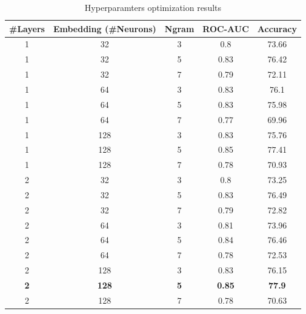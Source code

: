 \documentclass[conference]{IEEEtran}
\begin{document}
\begin{table}[h!]
	\centering
	\begin{tabular}{||c c c c c||} 
		\#Layers & Embedding (\#Neurons) & Ngram & ROC-AUC & Accuracy \\ [0.5ex] 
		\hline\hline
		1      & 32                      & 3     & 0.8     & 73.66    \\
		1      & 32                      & 5     & 0.83    & 76.42    \\
		1      & 32                      & 7     & 0.79    & 72.11    \\
		1      & 64                      & 3     & 0.83    & 76.1     \\
		1      & 64                      & 5     & 0.83    & 75.98    \\
		1      & 64                      & 7     & 0.77    & 69.96    \\
		1      & 128                     & 3     & 0.83    & 75.76    \\
		1      & 128                     & 5     & 0.85    & 77.41    \\
		1      & 128                     & 7     & 0.78    & 70.93    \\
		2      & 32                      & 3     & 0.8     & 73.25    \\
		2      & 32                      & 5     & 0.83    & 76.49    \\
		2      & 32                      & 7     & 0.79    & 72.82    \\
		2      & 64                      & 3     & 0.81    & 73.96    \\
		2      & 64                      & 5     & 0.84    & 76.46    \\
		2      & 64                      & 7     & 0.78    & 72.53    \\
		2      & 128                     & 3     & 0.83    & 76.15    \\
		\textbf{2} & \textbf{128}            & \textbf{5} & \textbf{0.85} & \textbf{77.9} \\
		2      & 128                     & 7     & 0.78    & 70.63    \\[1ex]
	\end{tabular}
	\caption{Hyperparamters optimization results}
	\label{table:hyper_results}
\end{table}
\end{document}
